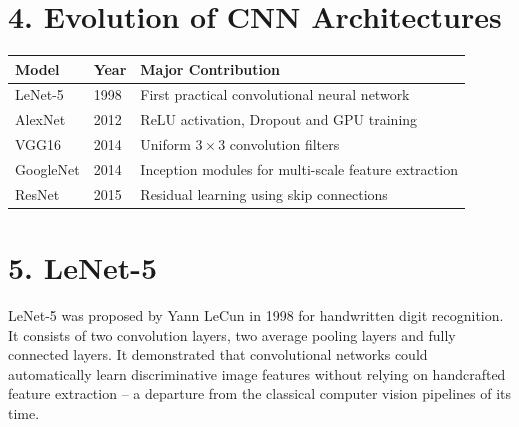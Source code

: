\documentclass[11pt]{article}
\begin{document}

\section*{4. Evolution of CNN Architectures}

\begin{center}

\begin{tabular}{|l|l|p{7cm}|}

\hline

Model & Year & Major Contribution\\

\hline

LeNet-5 & 1998 & First practical convolutional neural network\\

\hline

AlexNet & 2012 & ReLU activation, Dropout and GPU training\\

\hline

VGG16 & 2014 & Uniform $3\times3$ convolution filters\\

\hline

GoogleNet & 2014 & Inception modules for multi-scale feature extraction\\

\hline

ResNet & 2015 & Residual learning using skip connections\\

\hline

\end{tabular}

\end{center}


\section*{5. LeNet-5}

LeNet-5 was proposed by Yann LeCun in 1998 for handwritten digit recognition.
It consists of two convolution layers, two average pooling layers and fully
connected layers. It demonstrated that convolutional networks could
automatically learn discriminative image features without relying on
handcrafted feature extraction -- a departure from the classical computer
vision pipelines of its time.
\end{document}

